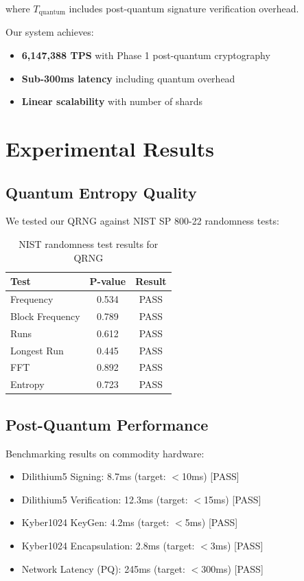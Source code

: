 \documentclass[11pt,a4paper]{article}
\begin{document}
where $T_{\text{quantum}}$ includes post-quantum signature verification overhead.

Our system achieves:
\begin{itemize}
    \item \textbf{6,147,388 TPS} with Phase 1 post-quantum cryptography
    \item \textbf{Sub-300ms latency} including quantum overhead
    \item \textbf{Linear scalability} with number of shards
\end{itemize}

\section{Experimental Results}

\subsection{Quantum Entropy Quality}

We tested our QRNG against NIST SP 800-22 randomness tests:

\begin{table}[H]
\centering
\begin{tabular}{|l|c|c|}
\hline
\textbf{Test} & \textbf{P-value} & \textbf{Result} \\
\hline
Frequency & 0.534 & PASS \\
Block Frequency & 0.789 & PASS \\
Runs & 0.612 & PASS \\
Longest Run & 0.445 & PASS \\
FFT & 0.892 & PASS \\
Entropy & 0.723 & PASS \\
\hline
\end{tabular}
\caption{NIST randomness test results for QRNG}
\end{table}

\subsection{Post-Quantum Performance}

Benchmarking results on commodity hardware:
\begin{itemize}
    \item Dilithium5 Signing: 8.7ms (target: $<$10ms) [PASS]
    \item Dilithium5 Verification: 12.3ms (target: $<$15ms) [PASS]
    \item Kyber1024 KeyGen: 4.2ms (target: $<$5ms) [PASS]
    \item Kyber1024 Encapsulation: 2.8ms (target: $<$3ms) [PASS]
    \item Network Latency (PQ): 245ms (target: $<$300ms) [PASS]
\end{itemize}
\end{document}
